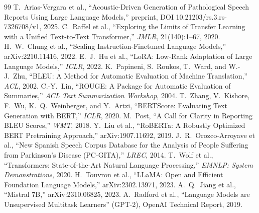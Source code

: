 \documentclass[11pt,twocolumn]{article}
\begin{document}
\begin{thebibliography}{99}
\small
{} T.\ Arias-Vergara et al., ``Acoustic-Driven Generation of Pathological
Speech Reports Using Large Language Models,'' preprint, DOI 10.21203/rs.3.rs-7326708/v1, 2025.
 C.\ Raffel et al., ``Exploring the Limits of Transfer Learning with a Unified
Text-to-Text Transformer,'' \emph{JMLR}, 21(140):1--67, 2020.
 H.\ W.\ Chung et al., ``Scaling Instruction-Finetuned Language Models,''
arXiv:2210.11416, 2022.
 E.\ J.\ Hu et al., ``LoRA: Low-Rank Adaptation of Large Language Models,''
\emph{ICLR}, 2022.
 K.\ Papineni, S.\ Roukos, T.\ Ward, and W.-J.\ Zhu, ``BLEU: A Method for
Automatic Evaluation of Machine Translation,'' \emph{ACL}, 2002.
 C.-Y.\ Lin, ``ROUGE: A Package for Automatic Evaluation of Summaries,'' \emph{ACL
Text Summarization Workshop}, 2004.
 T.\ Zhang, V.\ Kishore, F.\ Wu, K.\ Q.\ Weinberger, and Y.\ Artzi,
``BERTScore: Evaluating Text Generation with BERT,'' \emph{ICLR}, 2020.
 M.\ Post, ``A Call for Clarity in Reporting BLEU Scores,'' \emph{WMT}, 2018.
 Y.\ Liu et al., ``RoBERTa: A Robustly Optimized BERT Pretraining Approach,''
arXiv:1907.11692, 2019.
 J.\ R.\ Orozco-Arroyave et al., ``New Spanish Speech Corpus Database for the
Analysis of People Suffering from Parkinson's Disease (PC-GITA),'' \emph{LREC}, 2014.
 T.\ Wolf et al., ``Transformers: State-of-the-Art Natural Language
Processing,'' \emph{EMNLP: System Demonstrations}, 2020.
 H.\ Touvron et al., ``LLaMA: Open and Efficient Foundation Language
Models,'' arXiv:2302.13971, 2023.
 A.\ Q.\ Jiang et al., ``Mistral 7B,'' arXiv:2310.06825, 2023.
 A.\ Radford et al., ``Language Models are Unsupervised Multitask Learners''
(GPT-2), OpenAI Technical Report, 2019.
\end{thebibliography}
\end{document}
